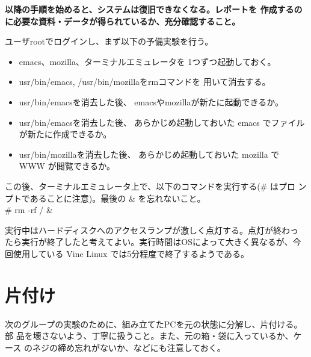 \documentclass[a4j,10pt]{jarticle}
\begin{document}
\begin{screen}
 {\bfseries 以降の手順を始めると、システムは復旧できなくなる。レポートを
 作成するのに必要な資料・データが得られているか、充分確認すること。}

 ユーザrootでログインし、まず以下の予備実験を行う。
 \begin{itemize}
  \item {\sffamily emacs}、{\sffamily mozilla}、ターミナルエミュレータを
	1つずつ起動しておく。
  \item {\sffamily {\slash}usr{\slash}bin{\slash}emacs}, {\sffamily
	{\slash}usr{\slash}bin{\slash}mozilla}を{\sffamily rm}コマンドを
	用いて消去する。
  \item {\sffamily {\slash}usr{\slash}bin{\slash}emacs}を消去した後、
	emacsやmozillaが新たに起動できるか。
  \item {\sffamily {\slash}usr{\slash}bin{\slash}emacs}を消去した後、
	あらかじめ起動しておいた emacs でファイルが新たに作成できるか。
  \item {\sffamily {\slash}usr{\slash}bin{\slash}mozilla}を消去した後、
	あらかじめ起動しておいた mozilla で WWW が閲覧できるか。
 \end{itemize}

 この後、ターミナルエミュレータ上で、以下のコマンドを実行する(\# はプロ
 ンプトであることに注意)。最後の \& を忘れないこと。\\
 {\sffamily \# rm -rf {\slash} \&}

 実行中はハードディスクへのアクセスランプが激しく点灯する。点灯が終わっ
 たら実行が終了したと考えてよい。実行時間はOSによって大きく異なるが、今
 回使用している Vine Linux では5分程度で終了するようである。
\end{screen}

\section{片付け}

次のグループの実験のために、組み立てたPCを元の状態に分解し、片付ける。部
品を壊さないよう、丁寧に扱うこと。また、元の箱・袋に入っているか、ケース
のネジの締め忘れがないか、などにも注意しておく。
\end{document}

